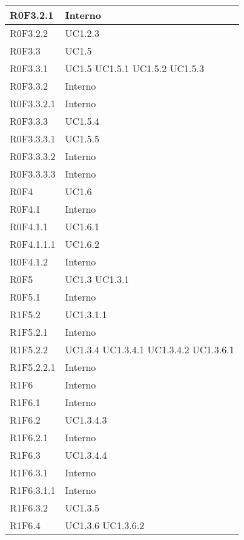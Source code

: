 \begin{center}
\begin{longtable}{| p{4cm} | p{4cm} |}
		\hline
		R0F3.2.1  &  Interno \\
		\hline
		R0F3.2.2  &  UC1.2.3 \\
		\hline
		R0F3.3  &  UC1.5 \\
		\hline
		R0F3.3.1  &  UC1.5 \newline UC1.5.1 \newline UC1.5.2 \newline UC1.5.3 \\
		\hline
		R0F3.3.2  &  Interno \\
		\hline
		R0F3.3.2.1  &  Interno \\
		\hline
		R0F3.3.3  &  UC1.5.4 \\
		\hline
		R0F3.3.3.1  &  UC1.5.5 \\
		\hline
		R0F3.3.3.2  &  Interno \\
		\hline
		R0F3.3.3.3  &  Interno \\
		\hline
		R0F4  &  UC1.6 \\
		\hline
		R0F4.1  &  Interno \\
		\hline
		R0F4.1.1  &  UC1.6.1 \\
		\hline
		R0F4.1.1.1  &  UC1.6.2 \\
		\hline
		R0F4.1.2  &  Interno \\
		\hline
		R0F5  &  UC1.3 \newline UC1.3.1 \\
		\hline
		R0F5.1  &  Interno \\
		\hline
		R1F5.2  &  UC1.3.1.1 \\
		\hline
		R1F5.2.1  &  Interno \\
		\hline
		R1F5.2.2  &  UC1.3.4 \newline UC1.3.4.1 \newline UC1.3.4.2 \newline UC1.3.6.1 \\
		\hline
		R1F5.2.2.1  &  Interno \\
		\hline
		R1F6  &  Interno \\
		\hline
		R1F6.1  &  Interno \\
		\hline
		R1F6.2  &  UC1.3.4.3 \\
		\hline
		R1F6.2.1  &  Interno \\
		\hline
		R1F6.3  &  UC1.3.4.4 \\
		\hline
		R1F6.3.1  &  Interno \\
		\hline
		R1F6.3.1.1  &  Interno \\
		\hline
		R1F6.3.2  &  UC1.3.5 \\
		\hline
		R1F6.4  &  UC1.3.6 \newline UC1.3.6.2 \\

\end{longtable}
\end{center}
